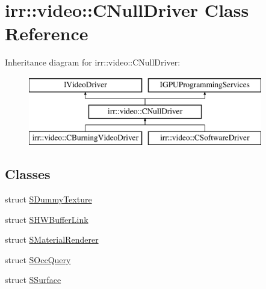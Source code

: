 \hypertarget{classirr_1_1video_1_1_c_null_driver}{\section{irr\-:\-:video\-:\-:C\-Null\-Driver Class Reference}
\label{classirr_1_1video_1_1_c_null_driver}
}
Inheritance diagram for irr\-:\-:video\-:\-:C\-Null\-Driver\-:\begin{figure}[H]
\begin{center}
\leavevmode
\includegraphics[height=3.000000cm]{classirr_1_1video_1_1_c_null_driver}
\end{center}
\end{figure}
\subsection*{Classes}
\begin{DoxyCompactItemize}
\item 
struct \hyperlink{structirr_1_1video_1_1_c_null_driver_1_1_s_dummy_texture}{S\-Dummy\-Texture}
\item 
struct \hyperlink{structirr_1_1video_1_1_c_null_driver_1_1_s_h_w_buffer_link}{S\-H\-W\-Buffer\-Link}
\item 
struct \hyperlink{structirr_1_1video_1_1_c_null_driver_1_1_s_material_renderer}{S\-Material\-Renderer}
\item 
struct \hyperlink{structirr_1_1video_1_1_c_null_driver_1_1_s_occ_query}{S\-Occ\-Query}
\item 
struct \hyperlink{structirr_1_1video_1_1_c_null_driver_1_1_s_surface}{S\-Surface}
\end{DoxyCompactItemize}
